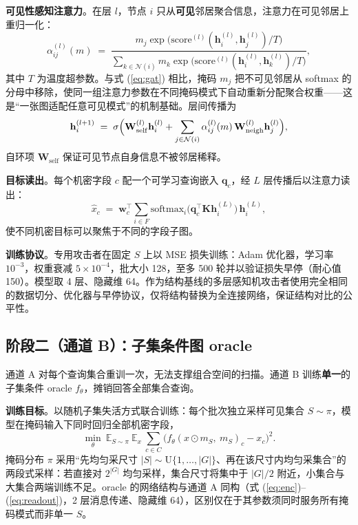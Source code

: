 \documentclass[10.5pt,compsoc,UTF8]{CjC}
\theoremstyle{mystyle}
\begin{document}
\textbf{可见性感知注意力}。在层 $l$，节点 $i$ 只从\textbf{可见}邻居聚合信息，注意力在可见邻居上重归一化：
\begin{equation}
\alpha_{ij}^{(l)}(m)\;=\;\frac{m_j\exp\bigl(\mathrm{score}^{(l)}(\mathbf{h}_i^{(l)},\mathbf{h}_j^{(l)})/T\bigr)}{\sum_{k\in\mathcal{N}(i)}m_k\exp\bigl(\mathrm{score}^{(l)}(\mathbf{h}_i^{(l)},\mathbf{h}_k^{(l)})/T\bigr)},
\label{eq:visatt}
\end{equation}
其中 $T$ 为温度超参数。与式 (\ref{eq:gat}) 相比，掩码 $m_j$ 把不可见邻居从 softmax 的分母中移除，使同一组注意力参数在不同掩码模式下自动重新分配聚合权重——这是“一张图适配任意可见模式”的机制基础。层间传播为
\begin{equation}
\mathbf{h}_i^{(l+1)}\;=\;\sigma\Bigl(\mathbf{W}_{\mathrm{self}}^{(l)}\mathbf{h}_i^{(l)}+\sum_{j\in\mathcal{N}(i)}\alpha_{ij}^{(l)}(m)\,\mathbf{W}_{\mathrm{neigh}}^{(l)}\mathbf{h}_j^{(l)}\Bigr),
\label{eq:layer}
\end{equation}
自环项 $\mathbf{W}_{\mathrm{self}}$ 保证可见节点自身信息不被邻居稀释。

\textbf{目标读出}。每个机密字段 $c$ 配一个可学习查询嵌入 $\mathbf{q}_c$，经 $L$ 层传播后以注意力读出：
\begin{equation}
\hat{x}_c\;=\;\mathbf{w}_c^{\top}\sum_{i\in F}\mathrm{softmax}_i\bigl(\mathbf{q}_c^{\top}\mathbf{K}\mathbf{h}_i^{(L)}\bigr)\,\mathbf{h}_i^{(L)},
\label{eq:readout}
\end{equation}
使不同机密目标可以聚焦于不同的字段子图。

\textbf{训练协议}。专用攻击者在固定 $S$ 上以 MSE 损失训练：Adam 优化器，学习率 $10^{-3}$，权重衰减 $5\times10^{-4}$，批大小 128，至多 500 轮并以验证损失早停（耐心值 150）。模型取 4 层、隐藏维 64。作为结构基线的多层感知机攻击者使用完全相同的数据切分、优化器与早停协议，仅将结构替换为全连接网络，保证结构对比的公平性。

\subsection{阶段二（通道 B）：子集条件图 oracle}

通道 A 对每个查询集合重训一次，无法支撑组合空间的扫描。通道 B 训练\textbf{单一}的子集条件 oracle $f_{\theta}$，摊销回答全部集合查询。

\textbf{训练目标}。以随机子集失活方式联合训练：每个批次独立采样可见集合 $S\sim\pi$，模型在掩码输入下同时回归全部机密字段，
\begin{equation}
\min_{\theta}\ \mathbb{E}_{S\sim\pi}\ \mathbb{E}_{x}\ \sum_{c\in C}\bigl(f_{\theta}(x\odot m_S,\ m_S)_c-x_c\bigr)^2 .
\label{eq:oracle}
\end{equation}
掩码分布 $\pi$ 采用“先均匀采尺寸 $|S|\sim\mathrm{U}\{1,\dots,|G|\}$、再在该尺寸内均匀采集合”的两段式采样：若直接对 $2^{|G|}$ 均匀采样，集合尺寸将集中于 $|G|/2$ 附近，小集合与大集合两端训练不足。oracle 的网络结构与通道 A 同构（式 (\ref{eq:enc})--(\ref{eq:readout})，2 层消息传递、隐藏维 64），区别仅在于其参数须同时服务所有掩码模式而非单一 $S$。
\end{document}
